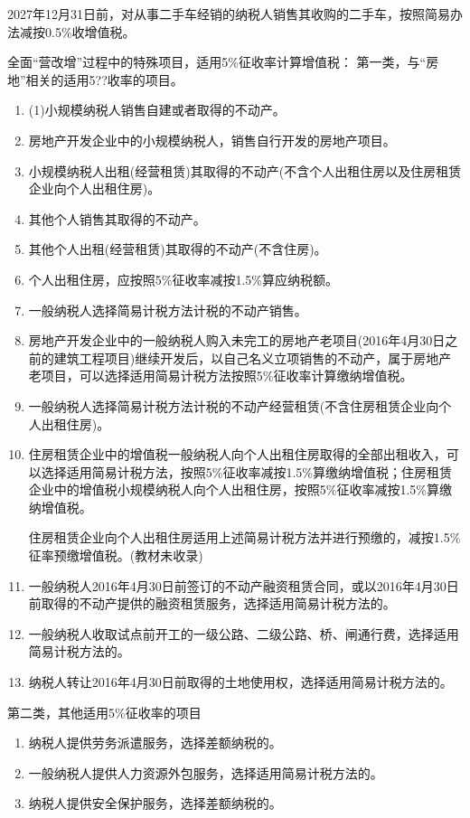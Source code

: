 \documentclass[UTF8,12pt]{ctexart}
\numberwithin{equation}{section} %
\numberwithin{figure}{section}
\numberwithin{table}{section}
\begin{document}
	2027年12月31日前，对从事二手车经销的纳税人销售其收购的二手车，按照简易办法减按0.5\%收增值税。
	
	全面“营改增”过程中的特殊项目，适用5\%征收率计算增值税：
	第一类，与“房地”相关的适用5??收率的项目。
	\begin{enumerate}
		\item (1)小规模纳税人销售自建或者取得的不动产。
		
		\item 房地产开发企业中的小规模纳税人，销售自行开发的房地产项目。
		
		\item 小规模纳税人出租(经营租赁)其取得的不动产(不含个人出租住房以及住房租赁企业向个人出租住房)。
		
		\item 其他个人销售其取得的不动产。
		
		\item 其他个人出租(经营租赁)其取得的不动产(不含住房)。
		
		\item 个人出租住房，应按照5\%征收率减按1.5\%算应纳税额。
		
		\item 一般纳税人选择简易计税方法计税的不动产销售。
		
		\item 房地产开发企业中的一般纳税人购入未完工的房地产老项目(2016年4月30日之前的建筑工程项目)继续开发后，以自己名义立项销售的不动产，属于房地产老项目，可以选择适用简易计税方法按照5\%征收率计算缴纳增值税。
		
		\item 一般纳税人选择简易计税方法计税的不动产经营租赁(不含住房租赁企业向个人出租住房)。
		
		\item 住房租赁企业中的增值税一般纳税人向个人出租住房取得的全部出租收入，可以选择适用简易计税方法，按照5\%征收率减按1.5\%算缴纳增值税；住房租赁企业中的增值税小规模纳税人向个人出租住房，按照5\%征收率减按1.5\%算缴纳增值税。
		
		住房租赁企业向个人出租住房适用上述简易计税方法并进行预缴的，减按1.5\%征率预缴增值税。(教材未收录)
		
		\item 一般纳税人2016年4月30日前签订的不动产融资租赁合同，或以2016年4月30日前取得的不动产提供的融资租赁服务，选择适用简易计税方法的。
		
		\item 一般纳税人收取试点前开工的一级公路、二级公路、桥、闸通行费，选择适用简易计税方法的。
		
		\item 纳税人转让2016年4月30日前取得的土地使用权，选择适用简易计税方法的。
	\end{enumerate}
	第二类，其他适用5\%征收率的项目
	\begin{enumerate}
		\item 纳税人提供劳务派遣服务，选择差额纳税的。
		
		\item 一般纳税人提供人力资源外包服务，选择适用简易计税方法的。
		
		\item 纳税人提供安全保护服务，选择差额纳税的。
	\end{enumerate}
	
\end{document}
